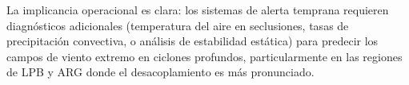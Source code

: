 La implicancia operacional es clara: los sistemas de alerta temprana requieren diagnósticos adicionales (temperatura del aire en seclusiones, tasas de precipitación convectiva, o análisis de estabilidad estática) para predecir los campos de viento extremo en ciclones profundos, particularmente en las regiones de LPB y ARG donde el desacoplamiento es más pronunciado.
